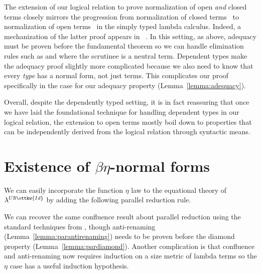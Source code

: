 \documentclass[acmsmall,screen=true,
\ifpublic review=false\else,review=true\fi
  ,anonymous=\ifanonymous true\else false\fi]{acmart}
\newcommand{\lang}{$\lambda^{U\mathbb{B}\ottkw{Id}}$\xspace}
\begin{document}
The extension of our logical relation to prove normalization of open
\emph{and} closed terms closely mirrors the progression from
normalization of closed terms~\citep{harpertait} to normalization of
open terms~\citep{harperkripke} in the simply typed lambda calculus.
Indeed, a mechanization of the latter proof appears in ~\citet{abel2019poplmark}.
In this setting, as above, adequacy must be proven before the
fundamental theorem so we can handle elimination rules such as
 and  where the scrutinee is a neutral term. %
%
Dependent types make the adequacy proof slightly more complicated because we
also need to know that every \emph{type} has a normal form, not just
terms. This complicates our proof specifically in the  case for
our adequacy property (Lemma~\ref{lemma:adequacy}).

Overall, despite the dependently typed setting, it is in fact reassuring that
once we have laid the foundational technique for handling dependent types in
our logical relation, the extension to open terms mostly boil down to
properties that can be independently derived from the logical relation through
syntactic means.

\section{Existence of $\beta\eta$-normal forms}
\label{sec:betaeta}
We can easily incorporate the function $\eta$ law to the equational
theory of \lang{} by adding the following parallel reduction rule.
\begin{center}
\end{center}
We can recover the same confluence result about parallel reduction
using the standard techniques from
\citet{barendregt:lambda-calculi-with-types,
takahashi-parallel-reduction}, though anti-renaming
(Lemma~\ref{lemma:parantirenaming}) needs to be proven before the
diamond property (Lemma~\ref{lemma:pardiamond}). Another complication
is that confluence and anti-renaming now requires induction on a size
metric of lambda terms so the $\eta$ case has a useful induction hypothesis.
\end{document}
